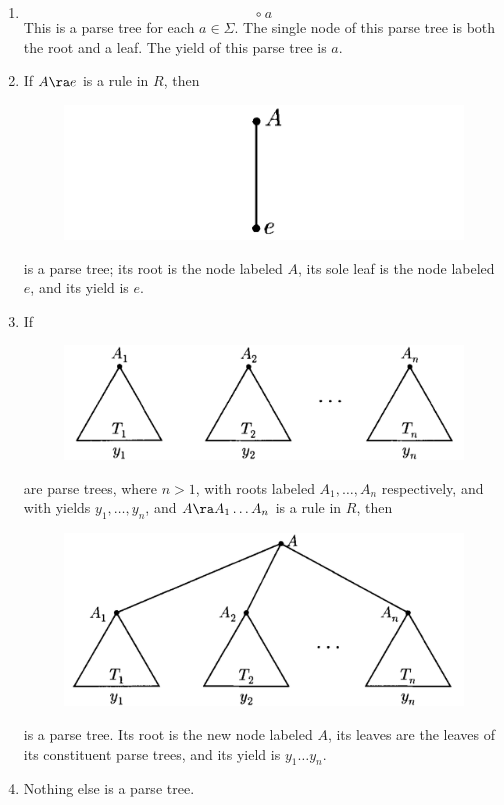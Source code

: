 \begin{multicols}{2}
\begin{enumerate}
    \item
        \begin{equation*}
            \circ\ a
        \end{equation*}
        This is a parse tree for each $a \in \Sigma$. The single node of this parse tree is both the root and a leaf. The yield of this parse tree is $a$.
    
    \item If $A \ra e$ is a rule in $R$, then %
        \begin{figure}[H]
            \centering
            \includegraphics[width=.4\textwidth]{img/parse-tree-2.png}
        \end{figure}
        is a parse tree; its root is the node labeled $A$, its sole leaf is the node labeled $e$, and its yield is $e$.
    
    \item If
        \begin{figure}[H]
            \centering
            \includegraphics[width=.4\textwidth]{img/parse-tree-3.png}
        \end{figure}
        are parse trees, where $n > 1$, with roots labeled $A_1, \ldots, A_n$ respectively, and with yields $y_1, \ldots, y_n$, and $A \ra A_1 \ldots A_n$ is a rule in $R$, then
        \begin{figure}[H]
            \centering
            \includegraphics[width=.4\textwidth]{img/parse-tree-4.png}
        \end{figure}
        is a parse tree. Its root is the new node labeled $A$, its leaves are the leaves of its constituent parse trees, and its yield is $y_1 \ldots y_n$.
    
    \item Nothing else is a parse tree.
\end{enumerate}


\end{multicols}
